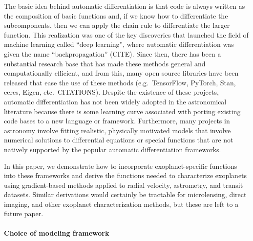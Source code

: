\documentclass[modern]{aastex62}
\begin{document}
The basic idea behind automatic differentiation is that code is always written
as the composition of basic functions and, if we know how to differentiate the
subcomponents, then we can apply the chain rule to differentiate the larger
function.
This realization was one of the key discoveries that launched the field of
machine learning called ``deep learning'', where automatic differentiation was
given the name ``backpropagation'' (CITE).
Since then, there has been a substantial research base that has made these
methods general and computationally efficient, and from this, many open source
libraries have been released that ease the use of these methods (e.g.\
TensorFlow, PyTorch, Stan, ceres, Eigen, etc.\ CITATIONS).
Despite the existence of these projects, automatic differentiation has not
been widely adopted in the astronomical literature because there is some
learning curve associated with porting existing code bases to a new language
or framework.
Furthermore, many projects in astronomy involve fitting realistic, physically
motivated models that involve numerical solutions to differential equations
or special functions that are not natively supported by the popular automatic
differentiation frameworks.

In this paper, we demonstrate how to incorporate exoplanet-specific functions
into these frameworks and derive the functions needed to characterize
exoplanets using gradient-based methods applied to radial velocity,
astrometry, and transit datasets.
Similar derivations would certainly be tractable for microlensing, direct
imaging, and other exoplanet characterization methods, but these are left to a
future paper.

\paragraph{Choice of modeling framework}
\end{document}
